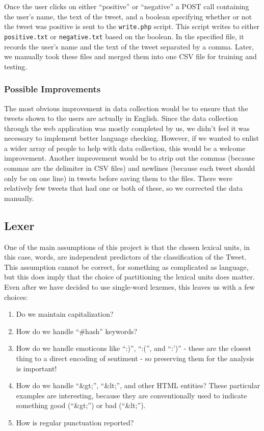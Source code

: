 \documentclass[12pt,a4paper]{article}
\begin{document}
Once the user clicks on either ``positive'' or ``negative'' a POST call containing the user’s name, the text of the tweet, and a boolean specifying whether or not the tweet was positive is sent to the \texttt{write.php} script. This script writes to either \texttt{positive.txt} or \texttt{negative.txt} based on the boolean. In the specified file, it records the user’s name and the text of the tweet separated by a comma. Later, we manually took these files and merged them into one CSV file for training and testing.

\subsubsection{Possible Improvements}

The most obvious improvement in data collection would be to ensure that the tweets shown to the users are actually in English. Since the data collection through the web application was mostly completed by us, we didn’t feel it was necessary to implement better language checking. However, if we wanted to enlist a wider array of people to help with data collection, this would be a welcome improvement. Another improvement would be to strip out the commas (because commas are the delimiter in CSV files) and newlines (because each tweet should only be on one line) in tweets before saving them to the files. There were relatively few tweets that had one or both of these, so we corrected the data manually.

\subsection { Lexer }

One of the main assumptions of this project is that the chosen lexical units, in this case, words, are independent predictors of the classification of the Tweet.  This assumption cannot be correct, for something as complicated as language, but this does imply that the choice of partitioning the lexical units does matter.  Even after we have decided to use single-word lexemes, this leaves us with a few choices:

\begin{enumerate}[1)]
\item Do we maintain capitalization?
\item How do we handle ``\#hash'' keywords?
\item How do we handle emoticons like ``:)'', ``:('', and ``:')'' - these are the closest thing to a direct encoding of sentiment - so preserving them for the analysis is important!
\item How do we handle ``\&gt;'', ``\&lt;'', and other HTML entities?  These particular examples are interesting, because they are conventionally used to indicate something good (``\&gt;'') or bad (``\&lt;'').
\item How is regular punctuation reported?
\end{enumerate}
\end{document}

